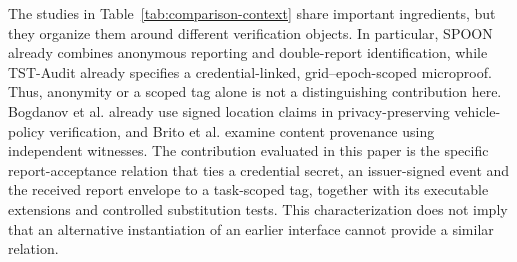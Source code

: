 %

The studies in Table~\ref{tab:comparison-context} share important ingredients, but they organize them around different verification objects. In particular, SPOON already combines anonymous reporting and double-report identification, while TST-Audit already specifies a credential-linked, grid--epoch-scoped microproof. Thus, anonymity or a scoped tag alone is not a distinguishing contribution here. Bogdanov et al. already use signed location claims in privacy-preserving vehicle-policy verification, and Brito et al. examine content provenance using independent witnesses. The contribution evaluated in this paper is the specific report-acceptance relation that ties a credential secret, an issuer-signed event and the received report envelope to a task-scoped tag, together with its executable extensions and controlled substitution tests. This characterization does not imply that an alternative instantiation of an earlier interface cannot provide a similar relation.


